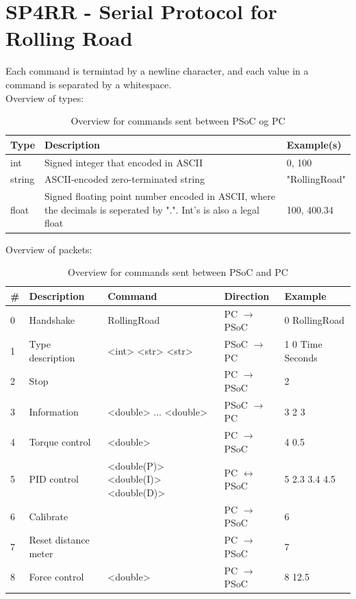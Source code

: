 \section{SP4RR - Serial Protocol for Rolling Road}
\label{sec:UART}
Each command is termintad by a newline character, and each value in a command is separated by a whitespace. \\

Overview of types:
\begin{table}[h!]
	\centering
	\label{Protocol:typeoverview}
	\begin{tabularx}{\linewidth}{p{1.5cm}Xp{3.5cm}}
		Type 	& Description 									& Example(s)    				\\\hline
		int  	& Signed integer that encoded in ASCII			& 0, 100 						\\
		string  & ASCII-encoded zero-terminated string 			& "RollingRoad"					\\ 
		float  	& Signed floating point number encoded in ASCII, where the decimals is seperated by ".". Int's is also a legal float      		& 100, 400.34 \\
	\end{tabularx}
	\caption{Overview for commands sent between PSoC og PC}
\end{table}

Overview of packets: 
\begin{table}[h!]
	\centering
	\label{Protocol:overviewRR}
	\begin{tabular}{l|llll}
		\# & Description 		& Command    		& Direction             & Example     		\\\hline
		0  & Handshake   		& RollingRoad 		& PC $\rightarrow$ PSoC & 0 RollingRoad 	\\
		1  & Type description 	& <int> <str> <str> & PSoC $\rightarrow$ PC & 1 0 Time Seconds 	\\
		2  & Stop        		&            		& PC $\rightarrow$ PSoC	& 2        			\\
		3  & Information 		& <double> ... <double>	& PSoC $\rightarrow$ PC & 3 2 3 	    	\\
		4  & Torque control 	& <double>    			& PC $\rightarrow$ PSoC & 4 0.5  				\\
		5  & PID control        & <double(P)> <double(I)> <double(D)> & PC $\leftrightarrow$ PSoC & 5 2.3 3.4 4.5 \\
		6  & Calibrate			&					& PC $\rightarrow$ PSoC & 6 \\ 
		7  & Reset distance meter & 				& PC $\rightarrow$ PSoC & 7 \\ 
		8  & Force control		& <double>    			& PC $\rightarrow$ PSoC & 8 12.5  				\\
	\end{tabular}
	\caption{Overview for commands sent between PSoC and PC}
\end{table}

